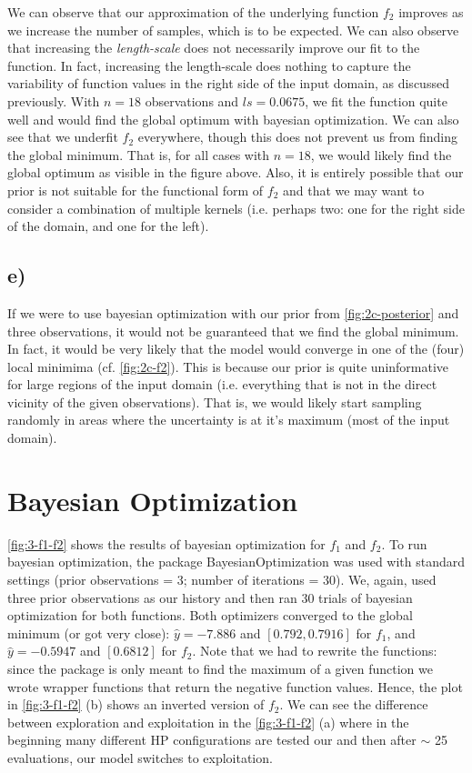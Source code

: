 \documentclass[11pt]{article}
\begin{document}
\noindent We can observe that our approximation of the underlying function $f_2$ improves as we increase the number of samples, which is to be expected. We can also observe that increasing the \textit{length-scale} does not necessarily improve our fit to the function. In fact, increasing the length-scale does nothing to capture the variability of function values in the right side of the input domain, as discussed previously. With $n=18$ observations and $ls=0.0675$, we fit the function quite well and would find the global optimum with bayesian optimization. We can also see that we underfit $f_2$ everywhere, though this does not prevent us from finding the global minimum. That is, for all cases with $n=18$, we would likely find the global optimum as visible in the figure above. Also, it is entirely possible that our prior is not suitable for the functional form of $f_2$ and that we may want to consider a combination of multiple kernels (i.e. perhaps two: one for the right side of the domain, and one for the left).

\subsection{e)}\label{subsec:gpr-e}

If we were to use bayesian optimization with our prior from \autoref{fig:2c-posterior} and three observations, it would not be guaranteed that we find the global minimum. In fact, it would be very likely that the model would converge in one of the (four) local minimima (cf. \autoref{fig:2c-f2}). This is because our prior is quite uninformative for large regions of the input domain (i.e. everything that is not in the direct vicinity of the given observations). That is, we would likely start sampling randomly in areas where the uncertainty is at it's maximum (most of the input domain). 

\section{Bayesian Optimization}\label{sec:bayes_opt}

\autoref{fig:3-f1-f2} shows the results of bayesian optimization for $f_1$ and $f_2$. To run bayesian optimization, the package BayesianOptimization \cite{nogueira2014bayes} was used with standard settings (prior observations = 3; number of iterations = 30). We, again, used three prior observations as our history and then ran 30 trials of bayesian optimization for both functions. Both optimizers converged to the global minimum (or got very close): $\hat{y}=-7.886$ and $[0.792, 0.7916 ]$ for $f_1$, and $\hat{y}=-0.5947$ and $[0.6812]$ for $f_2$. Note that we had to rewrite the functions: since the package is only meant to find the maximum of a given function we wrote wrapper functions that return the negative function values. Hence, the plot in \autoref{fig:3-f1-f2} (b) shows an inverted version of $f_2$. We can see the difference between exploration and exploitation in the \autoref{fig:3-f1-f2} (a) where in the beginning many different HP configurations are tested our and then after $\sim$ 25 evaluations, our model switches to exploitation.
\end{document}
